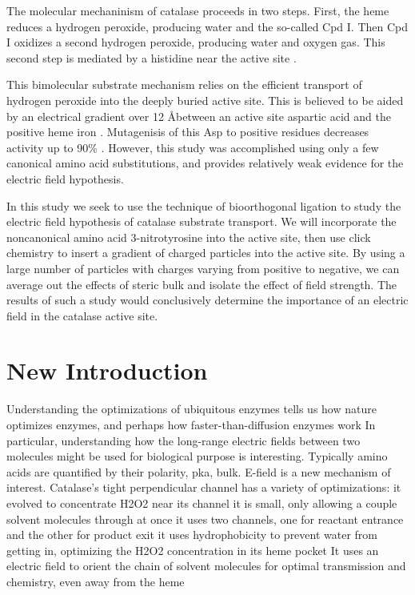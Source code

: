 \documentclass[journal=jacsat,manuscript=article]{achemso}
\begin{document}
The molecular mechaninism of catalase proceeds in two steps. First, the heme reduces a hydrogen peroxide, producing water and the so-called Cpd I. Then Cpd I oxidizes a second hydrogen peroxide, producing water and oxygen gas. This second step is mediated by a histidine near the active site \cite{alfonso-prieto}.

This bimolecular substrate mechanism relies on the efficient transport of hydrogen peroxide into the deeply buried active site. This is believed to be aided by an electrical gradient over 12 \AA between an active site aspartic acid and the positive heme iron \cite{chelikani}. Mutagenisis of this Asp to positive residues decreases activity up to 90\% \cite{chelikani}. However, this study was accomplished using only a few canonical amino acid substitutions, and provides relatively weak evidence for the electric field hypothesis.

In this study we seek to use the technique of bioorthogonal ligation to study the electric field hypothesis of catalase substrate transport. We will incorporate the noncanonical amino acid 3-nitrotyrosine into the active site, then use click chemistry to insert a gradient of charged particles into the active site. By using a large number of particles with charges varying from positive to negative, we can average out the effects of steric bulk and isolate the effect of field strength. The results of such a study would conclusively determine the importance of an electric field in the catalase active site.\\

\section{New Introduction}
Understanding the optimizations of ubiquitous enzymes tells us how nature optimizes enzymes, and perhaps how faster-than-diffusion enzymes work
In particular, understanding how the long-range electric fields between two molecules might be used for biological purpose is interesting. Typically amino acids are quantified by their polarity, pka, bulk. E-field is a new mechanism of interest.
Catalase's tight perpendicular channel has a variety of optimizations:
   it evolved to concentrate H2O2 near its channel
   it is small, only allowing a couple solvent molecules through at once
   it uses two channels, one for reactant entrance and the other for product exit
   it uses hydrophobicity to prevent water from getting in, optimizing the H2O2 concentration in its heme pocket
   It uses an electric field to orient the chain of solvent molecules for optimal transmission and chemistry, even away from the heme
\end{document}
